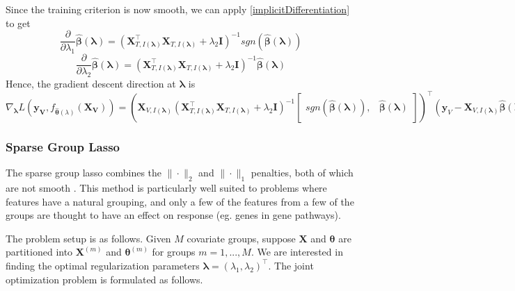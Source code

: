 \documentclass[10pt,letterpaper]{article}
\begin{document}
Since the training criterion is now smooth, we can apply \eqref{implicitDifferentiation} to get
\begin{equation}
\frac{\partial}{\partial \lambda_1} \hat{\boldsymbol{\beta}}(\boldsymbol{\lambda}) =
(\boldsymbol{X}_{T, I(\boldsymbol\lambda)}^\top \boldsymbol{X}_{T, I(\boldsymbol\lambda)} + \lambda_2 \boldsymbol{I})^{-1}
sgn \left (\hat{\boldsymbol{\beta}} (\boldsymbol{\lambda}) \right )
\end{equation}
\begin{equation}
\frac{\partial}{\partial \lambda_2} \hat{\boldsymbol{\beta}}(\boldsymbol{\lambda}) = (\boldsymbol{X}_{T, I(\boldsymbol\lambda)}^\top\boldsymbol{X}_{T, I(\boldsymbol\lambda)} + \lambda_2 \boldsymbol{I})^{-1}\hat{\boldsymbol{\beta}} (\boldsymbol{\lambda})
\end{equation}
Hence, the gradient descent direction at $\boldsymbol{\lambda}$ is
\begin{equation}
\nabla_{\boldsymbol \lambda} L(\boldsymbol{y_V}, f_{\hat{\boldsymbol{\theta}}(\lambda)}(\boldsymbol{X_V})) =
\left (
\boldsymbol{X}_{V, I(\boldsymbol\lambda)}
\left (
\boldsymbol{X}_{T, I(\boldsymbol\lambda)}^\top \boldsymbol{X}_{T, I(\boldsymbol\lambda)} + \lambda_2 \boldsymbol{I}
\right )^{-1}
\begin{bmatrix}
sgn(\hat{\boldsymbol{\beta}} (\boldsymbol{\lambda})), & \hat{\boldsymbol{\beta}} (\boldsymbol{\lambda})
\end{bmatrix}
\right )^{\top}
\left (
\boldsymbol y_V - \boldsymbol{X}_{V, I(\boldsymbol\lambda)} \hat{\boldsymbol{\beta}} (\boldsymbol{\lambda})
\right )
\end{equation}

\subsubsection{Sparse Group Lasso}

The sparse group lasso combines the $\|\cdot\|_2$ and $\|\cdot\|_1$ penalties, both of which are not smooth \citep{simon2013sparse}. This method is particularly well suited to problems where features have a natural grouping, and only a few of the features from a few of the groups are thought to have an effect on response (eg. genes in gene pathways).

The problem setup is as follows. Given $M$ covariate groups, suppose $\boldsymbol{X}$ and $\boldsymbol \theta$ are partitioned into $\boldsymbol{X}^{(m)}$ and $\boldsymbol \theta^{(m)}$ for groups $m = 1, ... , M$. We are interested in finding the optimal regularization parameters $\boldsymbol{\lambda} = (\lambda_1, \lambda_2)^\top$. The joint optimization problem is formulated as follows.
\end{document}
